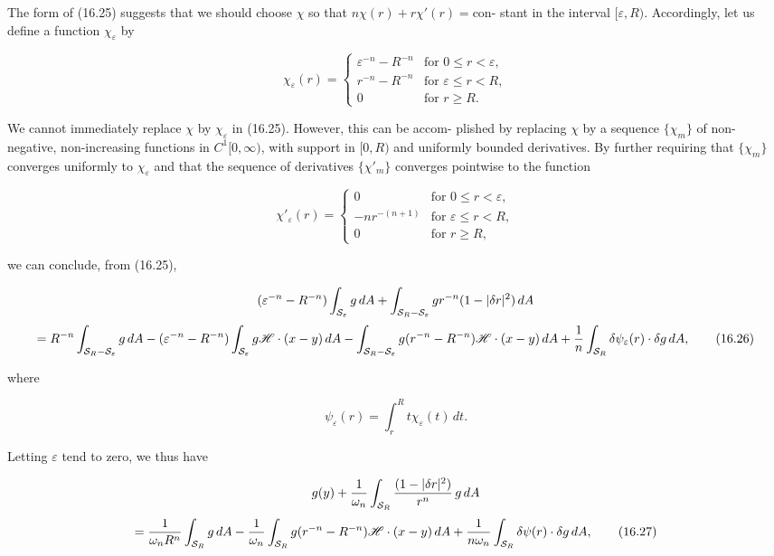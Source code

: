 
The form of (16.25) suggests that we should choose $\chi$ so that $n\chi(r)+r\chi'(r)=\mathrm{con}$-
stant in the interval $[\varepsilon, R)$. Accordingly, let us define a function $\chi_\varepsilon$ by

\[
\chi_\varepsilon(r)=
\begin{cases}
\varepsilon^{-n}-R^{-n} & \text{for } 0\leq r<\varepsilon,\\
r^{-n}-R^{-n} & \text{for } \varepsilon\leq r<R,\\
0 & \text{for } r\geq R.
\end{cases}
\]

We cannot immediately replace $\chi$ by $\chi_\varepsilon$ in (16.25). However, this can be accom-
plished by replacing $\chi$ by a sequence $\{\chi_m\}$ of non-negative, non-increasing functions
in $C^1[0,\infty)$, with support in $[0,R)$ and uniformly bounded derivatives. By further
requiring that $\{\chi_m\}$ converges uniformly to $\chi_\varepsilon$ and that the sequence of derivatives
$\{\chi'_m\}$ converges pointwise to the function

\[
\chi'_\varepsilon(r)=
\begin{cases}
0 & \text{for } 0\leq r<\varepsilon,\\
-nr^{-(n+1)} & \text{for } \varepsilon\leq r<R,\\
0 & \text{for } r\geq R,
\end{cases}
\]

we can conclude, from (16.25),

\[
(\varepsilon^{-n}-R^{-n})\int_{\mathcal{S}_\varepsilon} g\,dA+\int_{\mathcal{S}_R-\mathcal{S}_\varepsilon} gr^{-n}(1-|\delta r|^2)\,dA
\]
\begin{equation}
=R^{-n}\int_{\mathcal{S}_R-\mathcal{S}_\varepsilon} g\,dA-(\varepsilon^{-n}-R^{-n})\int_{\mathcal{S}_\varepsilon} g\mathscr{H}\cdot(x-y)\,dA
\notag\\
-\int_{\mathcal{S}_R-\mathcal{S}_\varepsilon} g(r^{-n}-R^{-n})\mathscr{H}\cdot(x-y)\,dA+\frac{1}{n}\int_{\mathcal{S}_R}\delta\psi_\varepsilon(r)\cdot\delta g\,dA,
\tag{16.26}
\end{equation}

where

\[
\psi_\varepsilon(r)=\int_r^R t\chi_\varepsilon(t)\,dt.
\]

Letting $\varepsilon$ tend to zero, we thus have

\[
g(y)+\frac{1}{\omega_n}\int_{\mathcal{S}_R}\frac{(1-|\delta r|^2)}{r^n}\,g\,dA
\]
\begin{equation}
=\frac{1}{\omega_n R^n}\int_{\mathcal{S}_R} g\,dA-\frac{1}{\omega_n}\int_{\mathcal{S}_R} g(r^{-n}-R^{-n})\mathscr{H}\cdot(x-y)\,dA
\notag\\
+\frac{1}{n\omega_n}\int_{\mathcal{S}_R}\delta\psi(r)\cdot\delta g\,dA,
\tag{16.27}
\end{equation}

